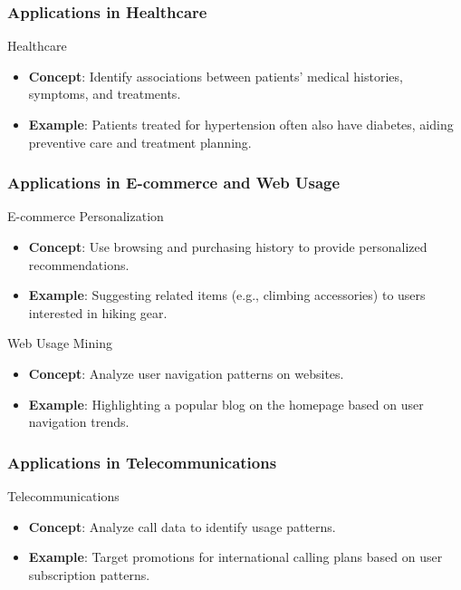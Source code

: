\documentclass[aspectratio=169]{beamer}
\begin{document}
\begin{frame}[fragile]
    \frametitle{Applications in Healthcare}
    \begin{block}{Healthcare}
        \begin{itemize}
            \item \textbf{Concept}: Identify associations between patients' medical histories, symptoms, and treatments.
            \item \textbf{Example}: 
            Patients treated for hypertension often also have diabetes, aiding preventive care and treatment planning.
        \end{itemize}
    \end{block}
\end{frame}

\begin{frame}[fragile]
    \frametitle{Applications in E-commerce and Web Usage}
    \begin{block}{E-commerce Personalization}
        \begin{itemize}
            \item \textbf{Concept}: Use browsing and purchasing history to provide personalized recommendations.
            \item \textbf{Example}: 
            Suggesting related items (e.g., climbing accessories) to users interested in hiking gear.
        \end{itemize}
    \end{block}
    
    \begin{block}{Web Usage Mining}
        \begin{itemize}
            \item \textbf{Concept}: Analyze user navigation patterns on websites.
            \item \textbf{Example}: Highlighting a popular blog on the homepage based on user navigation trends.
        \end{itemize}
    \end{block}
\end{frame}

\begin{frame}[fragile]
    \frametitle{Applications in Telecommunications}
    \begin{block}{Telecommunications}
        \begin{itemize}
            \item \textbf{Concept}: Analyze call data to identify usage patterns.
            \item \textbf{Example}: Target promotions for international calling plans based on user subscription patterns.
        \end{itemize}
    \end{block}
\end{frame}
\end{document}
